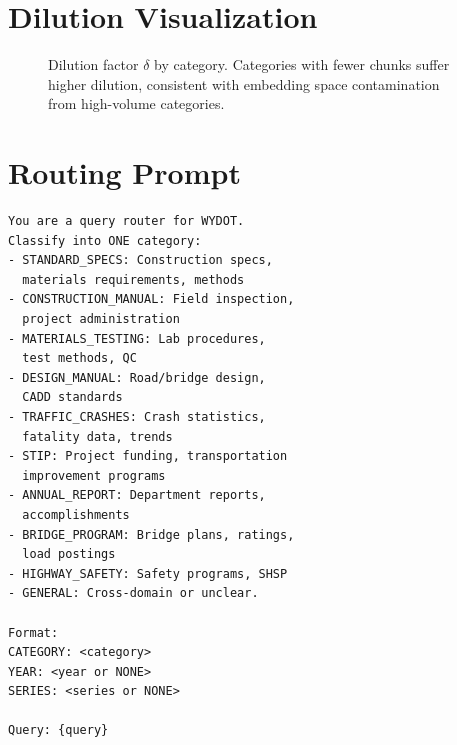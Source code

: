 \documentclass{article}
\begin{document}
\section{Dilution Visualization}
\label{app:dilution_viz}

\begin{figure}[H]
\centering
{}
\caption{Dilution factor $\delta$ by category. Categories with fewer chunks suffer higher dilution, consistent with embedding space contamination from high-volume categories.}
\label{fig:dilution}
\end{figure}

\section{Routing Prompt}
\label{app:routing_prompt}

\begin{lstlisting}[basicstyle=\ttfamily\scriptsize]
You are a query router for WYDOT.
Classify into ONE category:
- STANDARD_SPECS: Construction specs,
  materials requirements, methods
- CONSTRUCTION_MANUAL: Field inspection,
  project administration
- MATERIALS_TESTING: Lab procedures,
  test methods, QC
- DESIGN_MANUAL: Road/bridge design,
  CADD standards
- TRAFFIC_CRASHES: Crash statistics,
  fatality data, trends
- STIP: Project funding, transportation
  improvement programs
- ANNUAL_REPORT: Department reports,
  accomplishments
- BRIDGE_PROGRAM: Bridge plans, ratings,
  load postings
- HIGHWAY_SAFETY: Safety programs, SHSP
- GENERAL: Cross-domain or unclear.

Format:
CATEGORY: <category>
YEAR: <year or NONE>
SERIES: <series or NONE>

Query: {query}
\end{lstlisting}
\end{document}
